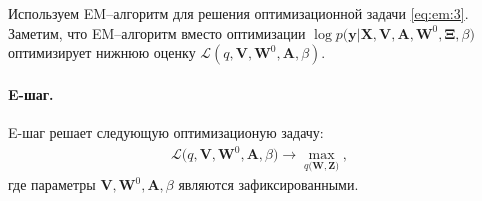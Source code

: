 Используем EM--алгоритм \cite{Dempster1977, bishop2006} для решения оптимизационной задачи \eqref{eq:em:3}. Заметим, что EM--алгоритм вместо оптимизации $\log p\bigr(\mathbf{y}|\mathbf{X}, \mathbf{V}, \textbf{A}, \textbf{W}^{0}, \bm{\Xi}, \beta\bigr)$ оптимизирует нижнюю оценку $\mathcal{L}\left(q, \textbf{V}, \textbf{W}^{0}, \textbf{A}, \beta\right)$.


\paragraph{E-шаг.} E-шаг решает следующую оптимизационую задачу:
\[
\label{eq:em:new:3}
\begin{aligned}
\mathcal{L}\bigr(q, \textbf{V}, \textbf{W}^{0}, \textbf{A}, \beta\bigr) \to \max_{q\bigr(\textbf{W}, \textbf{Z}\bigr)},
\end{aligned}
\]
где параметры $\textbf{V}, \textbf{W}^{0}, \textbf{A}, \beta$ являются зафиксированными.

